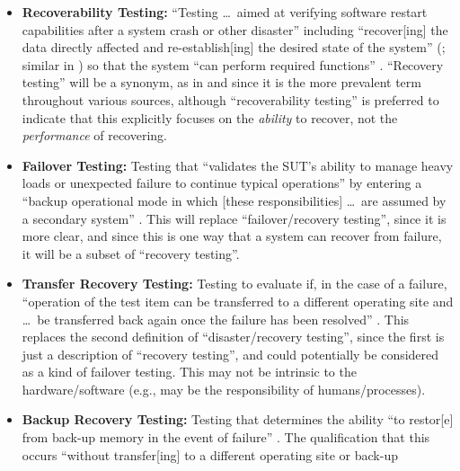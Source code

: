\begin{itemize}
      \item \textbf{Recoverability Testing:} ``Testing \dots\ aimed at
            verifying software restart capabilities after a system crash or
            other disaster'' \citep[p.~5-9]{SWEBOK2024} including ``recover[ing]
            the data directly affected and re-establish[ing] the desired state
            of the system'' (\citealp{ISO_IEC2023a}; similar in
            \citealp[p.~7-10]{SWEBOK2024}) so that the system ``can perform
            required functions'' \citep[p.~370]{IEEE2017}. ``Recovery testing''
            will be a synonym, as in \citep[p.~47]{Kam2008} and since it is the
            more prevalent term throughout various sources, although
            ``recoverability testing'' is preferred to indicate that this
            explicitly focuses on the \emph{ability} to
            recover, not the \emph{performance} of recovering.
      \item \textbf{Failover Testing:} Testing that ``validates the SUT's
            ability to manage heavy loads or unexpected failure to continue
            typical operations'' \cite[p.~5-9]{SWEBOK2024} by entering a
            ``backup operational mode in which [these responsibilities] \dots\
            are assumed by a secondary system'' \citepISTQB{}. This will
            replace ``failover/recovery testing'', since it is more clear, and
            since this is one way that a system can recover from failure, it
            will be a subset of ``recovery testing''.
      \item \textbf{Transfer Recovery Testing:} Testing to evaluate if,
            in the case of a failure, ``operation of the test item can be
            transferred to a different operating site and \dots\ be transferred
            back again once the failure has been resolved''
            \citeyearpar[p.~37]{IEEE2021}. This replaces the second definition
            of ``disaster/recovery testing'', since the first is just a
            description of ``recovery testing'', and could potentially be
            considered as a kind of failover testing. This may not be
            intrinsic to the hardware/software (e.g., may be the responsibility
            of humans/processes).
      \item \textbf{Backup Recovery Testing:} Testing that determines the
            ability ``to restor[e] from back-up memory in the event of failure''
            \citep[p.~37]{IEEE2021}. The qualification that this occurs
            ``without transfer[ing] to a different operating site or back-up

\end{itemize}
